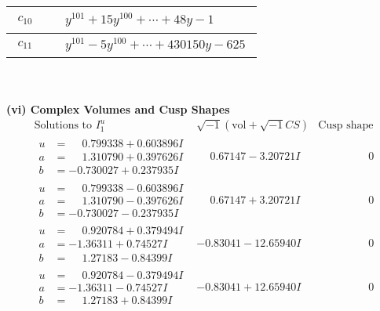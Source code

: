 \documentclass[1p]{elsarticle_modified}
\theoremstyle{definition}
\newcommand{\I}{\sqrt{-1}}
\begin{document}
\begin{tabular}{m{50pt}|m{274pt}}
\hline $$\begin{aligned}c_{10}\end{aligned}$$&$\begin{aligned}
&y^{101}+15 y^{100}+\cdots+48 y-1
\end{aligned}$\\
\hline $$\begin{aligned}c_{11}\end{aligned}$$&$\begin{aligned}
&y^{101}-5 y^{100}+\cdots+430150 y-625
\end{aligned}$\\
\hline
\end{tabular}\\~\\
\newpage\flushleft \textbf{(vi) Complex Volumes and Cusp Shapes}
$$\begin{array}{c|c|c}  
\text{Solutions to }I^u_{1}& \I (\text{vol} + \sqrt{-1}CS) & \text{Cusp shape}\\
 \hline 
\begin{aligned}
u &= \phantom{-}0.799338 + 0.603896 I \\
a &= \phantom{-}1.310790 + 0.397626 I \\
b &= -0.730027 + 0.237935 I\end{aligned}
 & \phantom{-}0.67147 - 3.20721 I & \phantom{-0.000000 } 0 \\ \hline\begin{aligned}
u &= \phantom{-}0.799338 - 0.603896 I \\
a &= \phantom{-}1.310790 - 0.397626 I \\
b &= -0.730027 - 0.237935 I\end{aligned}
 & \phantom{-}0.67147 + 3.20721 I & \phantom{-0.000000 } 0 \\ \hline\begin{aligned}
u &= \phantom{-}0.920784 + 0.379494 I \\
a &= -1.36311 + 0.74527 I \\
b &= \phantom{-}1.27183 - 0.84399 I\end{aligned}
 & -0.83041 - 12.65940 I & \phantom{-0.000000 } 0 \\ \hline\begin{aligned}
u &= \phantom{-}0.920784 - 0.379494 I \\
a &= -1.36311 - 0.74527 I \\
b &= \phantom{-}1.27183 + 0.84399 I\end{aligned}
 & -0.83041 + 12.65940 I & \phantom{-0.000000 } 0 \\ \hline\begin{aligned}

\end{aligned}
\end{array}$$
\end{document}
